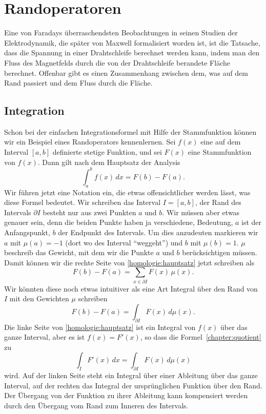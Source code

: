 %
%
%
\section{Randoperatoren}
Eine von Faradays überraschendsten Beobachtungen in seinen
Studien der Elektrodynamik, die später von Maxwell formalisiert
worden ist, ist die Tatsache, dass die Spannung in einer Drahtschleife
berechnet werden kann, indem man den Fluss des Magnetfelds durch die
von der Drahtschleife berandete Fläche berechnet.
Offenbar gibt es einen Zusammenhang zwischen dem, was auf dem Rand
passiert und dem Fluss durch die Fläche.

\subsection{Integration}
Schon bei der einfachen Integrationsformel mit Hilfe der Stammfunktion
können wir ein Beispiel eines Randoperators kennenlernen.
Sei $f(x)$ eine auf dem Interval $[a,b]$ definierte stetige Funktion,
und sei $F(x)$ eine Stammfunktion von $f(x)$.
Dann gilt nach dem Hauptsatz der Analysis
\begin{equation}
\int_a^b f(x)\,dx = F(b)-F(a).
\label{homologie:hauptsatz}
\end{equation}
Wir führen jetzt eine Notation ein, die etwas offensichtlicher werden
lässt, was diese Formel bedeutet.
Wir schreiben das Interval $I=[a,b]$, der Rand des Intervals 
$\partial I$ besteht nur aus zwei Punkten $a$ und $b$.
Wir müssen aber etwas genauer sein, denn die beiden Punkte haben
ja verschiedene, Bedeutung, $a$ ist der Anfangspunkt, $b$ der Endpunkt
des Intervals.
Um dies anzudeuten markieren wir $a$ mit $\mu(a)=-1$ (dort wo des Interval
``weggeht'') und $b$ mit $\mu(b)=1$.
$\mu$ beschreib das Gewicht, mit dem wir die Punkte $a$ und $b$
berücksichtigen müssen.
Damit können wir die rechte Seite von \eqref{homologie:hauptsatz}
jetzt schreiben als
\[
F(b)-F(a)
=
\sum_{x\in \partial I} F(x)\,\mu(x).
\]
Wir könnten diese noch etwas intuitiver als eine Art Integral über
den Rand von $I$ mit den Gewichten $\mu$ schreiben
\[
F(b)-F(a) = \int_{\partial I} F(x)\,d\mu(x).
\]
Die linke Seite von \eqref{homologie:hauptsatz} ist ein Integral von
$f(x)$ über das ganze Interval, aber es ist $f(x)=F'(x)$, 
so dass die Formel~\eqref{chapter:quotient} zu
\[
\int_I F'(x)\,dx = \int_{\partial I} F(x)\,d\mu(x)
\]
wird.
Auf der linken Seite steht ein Integral über einer Ableitung 
über das ganze Interval, auf der rechten das Integral der
ursprünglichen Funktion über den Rand.
Der Übergang von der Funktion zu ihrer Ableitung kann kompensiert
werden durch den Übergang vom Rand zum Inneren des Intervals.

